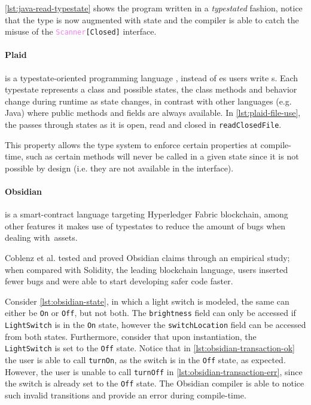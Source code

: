 \autoref{lst:java-read-typestate} shows the  program written in a \emph{typestated} fashion,
notice that the  type is now augmented with state and
the compiler is able to catch the misuse of the \texttt{\textcolor{violet}{Scanner}[Closed]} interface.



\paragraph{Plaid} is a typestate-oriented programming language \autocite{Aldrich2009},
instead of es users write s.
Each typestate represents a class and possible states,
the class methods and behavior change during runtime as state changes,
in contrast with other languages (e.g. Java) where public methods and fields are always available.
In \autoref{lst:plaid-file-use}, the  passes through states as it is open, read and closed in \texttt{readClosedFile}.

This property allows the type system to enforce certain properties at compile-time,
such as certain methods will never be called in a given state since it is not possible by design
(i.e. they are not available in the interface).



\paragraph{Obsidian} is a smart-contract language targeting Hyperledger Fabric blockchain,
among other features it makes use of typestates to reduce the amount of bugs when dealing with~assets.

Coblenz et al. \autocite{Coblenz2020} tested and proved Obsidian claims through an empirical study;
when compared with Solidity, the leading blockchain language,
users inserted fewer bugs and were able to start developing safer code faster.

Consider \autoref{lst:obsidian-state}, in which a light switch is modeled,
the same can either be \texttt{On} or \texttt{Off}, but not both.
The \texttt{brightness} field can only be accessed if \texttt{LightSwitch} is in the \texttt{On} state,
however the \texttt{switchLocation} field can be accessed from both states.
Furthermore, consider that upon instantiation, the \texttt{LightSwitch} is set to the \texttt{Off} state.
Notice that in \autoref{lst:obsidian-transaction-ok} the user is able to call \texttt{turnOn},
as the switch is in the \texttt{Off} state, as expected.
However, the user is unable to call \texttt{turnOff} in \autoref{lst:obsidian-transaction-err},
since the switch is already set to the \texttt{Off} state.
The Obsidian compiler is able to notice such invalid transitions and provide an error during compile-time.

